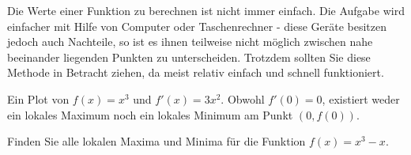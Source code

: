 Die Werte einer Funktion zu berechnen ist nicht immer einfach. Die Aufgabe wird einfacher mit Hilfe von Computer oder Taschenrechner - diese Geräte besitzen jedoch auch Nachteile, so ist es ihnen teilweise nicht möglich zwischen nahe beeinander liegenden Punkten zu unterscheiden. Trotzdem sollten Sie diese Methode in Betracht ziehen, da meist relativ einfach und schnell funktioniert.

\begin{marginfigure}[0in]
\caption{Ein Plot von $f(x) = x^3$ und $f'(x) = 3x^2$. Obwohl $f'(0)=0$,
  existiert weder ein lokales Maximum noch ein lokales Minimum am Punkt $(0,f(0))$.}
\label{figure:x^3}
\end{marginfigure}


\begin{example}
Finden Sie alle lokalen Maxima und Minima für die Funktion
$f(x)=x^3-x$. 
\end{example}

